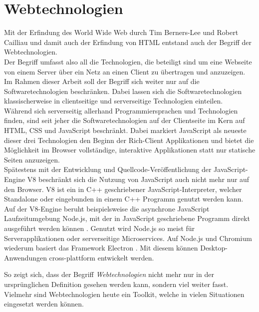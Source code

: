 \section{Webtechnologien}
\label{sec:webtechnologien}

Mit der Erfindung des World Wide Web durch Tim Berners-Lee und Robert Cailliau und damit auch der Erfindung 
von HTML \cite{www} entstand auch der Begriff der Webtechnologien.\\
Der Begriff umfasst also all die Technologien, die beteiligt sind um eine Webseite von einem Server über ein 
Netz an einen Client zu übertragen und anzuzeigen.\\

Im Rahmen dieser Arbeit soll der Begriff sich weiter nur auf die Softwaretechnologien beschränken. Dabei lassen
sich die Softwaretechnologien klassischerweise in clientseitige und serverseitige Technologien einteilen.\\
Während sich serverseitig allerhand Programmiersprachen und Technologien finden, sind seit jeher die Softwaretechnologien
auf der Clientseite im Kern auf HTML, CSS und JavaScript beschränkt. Dabei markiert JavaScript als neueste dieser
drei Technologien \cite{jspress} den Beginn der Rich-Client Applikationen und bietet die Möglichkeit im Browser 
vollständige, interaktive Applikationen statt nur statische Seiten anzuzeigen.\\
Spätestens mit der Entwicklung und Quellcode-Veröffentlichung der JavaScript-Engine V8 \cite{v8} beschränkt sich die Nutzung
von JavaScript auch nicht mehr nur auf den Browser. V8 ist ein in C++ geschriebener JavaScript-Interpreter,
welcher Standalone oder eingebunden in einem C++ Programm genutzt werden kann.\\
Auf der V8-Engine beruht beispielsweise die asynchrone JavaScript Laufzeitumgebung Node.js, mit der in 
JavaScript geschriebene Programm direkt ausgeführt werden können \cite{node}. Genutzt wird Node.js so meist für Serverapplikationen
oder serverseitige Microservices.
Auf Node.js und Chromium wiederum basiert das Framework Electron \cite{electron}. Mit diesem können Desktop-Anwendungen
cross-plattform entwickelt werden.

So zeigt sich, dass der Begriff \emph{Webtechnologien} nicht mehr nur in der ursprünglichen Definition gesehen werden kann,
sondern viel weiter fasst. Vielmehr sind Webtechnologien heute ein Toolkit, welche in vielen Situationen eingesetzt werden
können. 


% 
